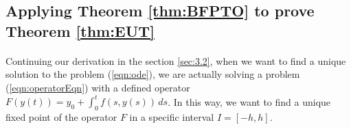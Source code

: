 \documentclass{article}
\theoremstyle{definition}
\theoremstyle{remark}
\theoremstyle{example}
\begin{document}
\subsection{Applying Theorem \ref{thm:BFPTO} to prove Theorem \ref{thm:EUT}}\label{sec:3.5}

\paragraph{  }

Continuing our derivation in the section \ref{sec:3.2}, when we want to find a unique solution to the problem (\ref{eqn:ode}), we are actually solving a problem (\ref{eqn:operatorEqn}) with a defined operator $F(y(t)) = y_0 + \int_{0}^{t}{f(s,y(s))} \,ds$. In this way, we want to find a unique fixed point of the operator $F$ in a specific interval $I = [-h, h]$. 
\end{document}
